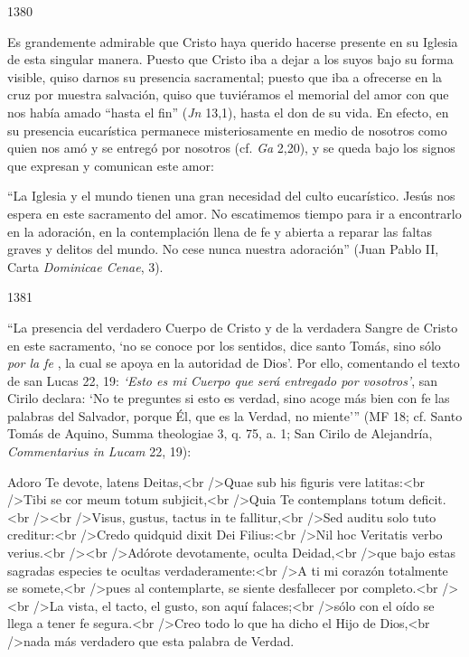 			\begin{ccebody}\begin{ccenumber}1380\end{ccenumber} Es grandemente admirable que Cristo haya querido hacerse presente en su Iglesia de esta singular manera. Puesto que Cristo iba a dejar a los suyos bajo su forma visible, quiso darnos su presencia sacramental; puesto que iba a ofrecerse en la cruz por muestra salvación, quiso que tuviéramos el memorial del amor con que nos había amado “hasta el fin” (\textit{Jn} 13,1), hasta el don de su vida. En efecto, en su presencia eucarística permanece misteriosamente en medio de nosotros como quien nos amó y se entregó por nosotros (cf. \textit{Ga} 2,20), y se queda bajo los signos que expresan y comunican este amor:\end{ccebody}
			
			\begin{ccecite}“La Iglesia y el mundo tienen una gran necesidad del culto eucarístico. Jesús nos espera en este sacramento del amor. No escatimemos tiempo para ir a encontrarlo en la adoración, en la contemplación llena de fe y abierta a reparar las faltas graves y delitos del mundo. No cese nunca nuestra adoración” (Juan Pablo II, Carta \textit{Dominicae Cenae}, 3).\end{ccecite}
			
			\begin{ccebody}\begin{ccenumber}1381\end{ccenumber} “La presencia del verdadero Cuerpo de Cristo y de la verdadera Sangre de Cristo en este sacramento, ‘no se conoce por los sentidos, dice santo Tomás, sino sólo \textit{por la fe} , la cual se apoya en la autoridad de Dios’. Por ello, comentando el texto de san Lucas 22, 19: \textit{‘Esto es mi Cuerpo que será entregado por vosotros’}, san Cirilo declara: ‘No te preguntes si esto es verdad, sino acoge más bien con fe las palabras del Salvador, porque Él, que es la Verdad, no miente’” (MF 18; cf. Santo Tomás de Aquino, Summa theologiae 3, q. 75, a. 1; San Cirilo de Alejandría, \textit{Commentarius in Lucam} 22, 19):\end{ccebody}
			
			\begin{ccecite}Adoro Te devote, latens Deitas,<br />Quae sub his figuris vere latitas:<br />Tibi se cor meum totum subjicit,<br />Quia Te contemplans totum deficit.<br /><br />Visus, gustus, tactus in te fallitur,<br />Sed auditu solo tuto creditur:<br />Credo quidquid dixit Dei Filius:<br />Nil hoc Veritatis verbo verius.<br /><br />Adórote devotamente, oculta Deidad,<br />que bajo estas sagradas especies te ocultas verdaderamente:<br />A ti mi corazón totalmente se somete,<br />pues al contemplarte, se siente desfallecer por completo.<br /><br />La vista, el tacto, el gusto, son aquí falaces;<br />sólo con el oído se llega a tener fe segura.<br />Creo todo lo que ha dicho el Hijo de Dios,<br />nada más verdadero que esta palabra de Verdad. \end{ccecite}
			
